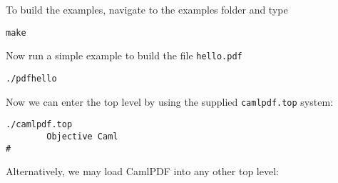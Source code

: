 \documentclass[a4paper]{memoir}
\begin{document}
\noindent To build the examples, navigate to the examples folder and type
\begin{framed}
\verb!make!
\end{framed}
\noindent Now run a simple example to build the file \verb!hello.pdf!
\begin{framed}
\verb!./pdfhello!
\end{framed}
\noindent Now we can enter the top level by using the supplied \texttt{camlpdf.top} system:

\begin{framed}
\begin{verbatim}
./camlpdf.top
        Objective Caml
#
\end{verbatim}
\end{framed}

\noindent Alternatively, we may load CamlPDF into any other top level:
\end{document}
